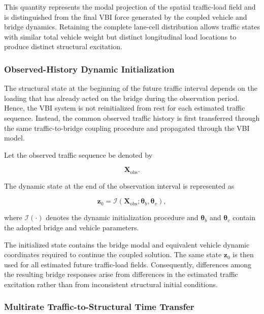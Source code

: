 \documentclass[journal]{IEEEtran}
\begin{document}
This quantity represents the modal projection of the spatial traffic-load field and is distinguished from the final VBI force generated by the coupled vehicle and bridge dynamics. Retaining the complete lane-cell distribution allows traffic states with similar total vehicle weight but distinct longitudinal load locations to produce distinct structural excitation.




\subsubsection{Observed-History Dynamic Initialization}

The structural state at the beginning of the future traffic interval depends on the loading that has already acted on the bridge during the observation period. Hence, the VBI system is not reinitialized from rest for each estimated traffic sequence. Instead, the common observed traffic history is first transferred through the same traffic-to-bridge coupling procedure and propagated through the VBI model.

Let the observed traffic sequence be denoted by

\begin{equation}
\mathbf{X}_{\mathrm{obs}}.
\end{equation}

The dynamic state at the end of the observation interval is represented as

\begin{equation}
\mathbf{z}_{0}
=
\mathcal{I}
\left(
\mathbf{X}_{\mathrm{obs}};
\boldsymbol{\theta}_{b},
\boldsymbol{\theta}_{v}
\right),
\end{equation}

where $\mathcal{I}(\cdot)$ denotes the dynamic initialization procedure and $\boldsymbol{\theta}_{b}$ and $\boldsymbol{\theta}_{v}$ contain the adopted bridge and vehicle parameters.

The initialized state contains the bridge modal and equivalent vehicle dynamic coordinates required to continue the coupled solution. The same state $\mathbf{z}_{0}$ is then used for all estimated future traffic-load fields. Consequently, differences among the resulting bridge responses arise from differences in the estimated traffic excitation rather than from inconsistent structural initial conditions.



\subsubsection{Multirate Traffic-to-Structural Time Transfer}
\end{document}
